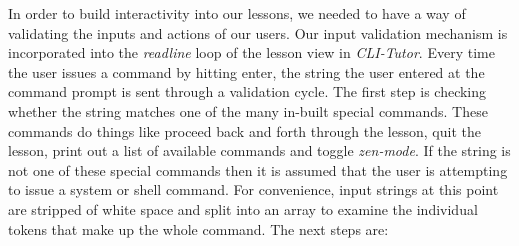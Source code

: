 In order to build interactivity into our lessons, we needed to have a way of
validating the inputs and actions of our users. Our input validation mechanism
is incorporated into the \textit{readline} loop of the lesson view in
\textit{CLI-Tutor}. Every time the user issues a command by hitting enter, the
string the user entered at the command prompt is sent through a validation
cycle. The first step is checking whether the string matches one of the many
in-built special commands. These commands do things like proceed back and forth
through the lesson, quit the lesson, print out a list of available commands and
toggle \textit{zen-mode}. If the string is not one of these special commands
then it is assumed that the user is attempting to issue a system or shell
command. For convenience, input strings at this point are stripped of white space and split into an array
to examine the individual tokens that make up the whole command. The next steps are:

